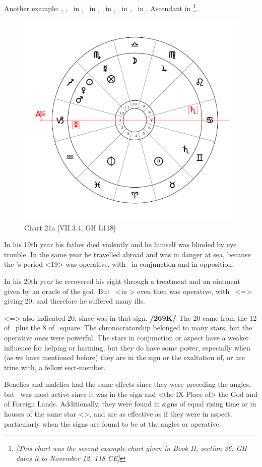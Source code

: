 \newpage
Another example: \Sun, \Mars, \Venus\, in \Sagittarius, \Moon\, in \Libra, \Saturn\, in \Gemini, \Jupiter\, in
\Virgo, \Mercury\, in \Scorpio, Ascendant in \Capricorn\footnote{\textit{[This chart was the second example chart given in Book II, section 36. GH dates it to November 12, 118 CE]}}.

\begin{figure}
\centering
\vspace{-3em}
\includegraphics[width=.68\textwidth]{charts/2_36_2}
\caption{Chart 21a [VII.3.4, GH L118]}
\label{fig:chart21a}
\end{figure} 

In his 19th year his father died violently and he himself was blinded by eye trouble. In the same year he travelled abroad and was in danger at sea, because the \Sun’s period <19> was operative, with \Mars\, in conjunction and \Saturn in opposition. 

In his 20th year he recovered his sight through a treatment and an ointment given by an oracle of the god. But \Saturn\, <in
\Gemini> even then was operative, with \Gemini\, <=\Mercury> giving 20, and therefore he suffered many ills.

\Virgo <=\Mercury> also indicated 20, since \Jupiter was in that sign. \textbf{/269K/} The 20 came from the 12 of \Jupiter\, plus the 8 of \Venus\, square. The chronocratorship belonged to many stars, but the operative ones were powerful. The stars in conjunction or aspect have a weaker influence for helping or harming, but they do have some power, especially when (as we have mentioned before) they are in the sign or the exaltation of, or are trine with, a fellow sect-member. 

Benefics and malefics had the same effects since they were preceding the angles, but \Jupiter\, was most active since it was in the sign and <the IX Place of> the God and of Foreign Lands. Additionally, they were found in signs of equal rising time or in houses of the same star <\Mercury>, and are as effective as if they were in aspect, particularly when the signs are found to be at
the angles or operative.

